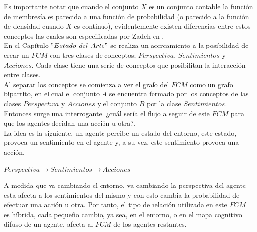 Es importante notar que cuando el conjunto $X$ es un conjunto contable la función de membresía es parecida a una 
función de probabilidad (o parecido a la función de densidad cuando $X$ es continuo), evidentemente existen
diferencias entre estos conceptos las cuales son especificadas por Zadeh en \autocite{Zadeh1965}.\\


En el Capítulo $"Estado$ $del$ $Arte"$ se realiza un acercamiento a la posibilidad de crear un $FCM$ con tres clases de 
conceptos; $Perspectiva$, $Sentimientos$ y $Acciones$. Cada clase tiene una serie de conceptos que posibilitan la 
interacción entre clases.\\
Al separar los conceptos se comienza a ver el grafo del $FCM$ como un grafo bipartito, en el cual el conjunto $A$
se encuentra formado por los conceptos de las clases $Perspectiva$ y $Acciones$ y el conjunto $B$ por la clase
$Sentimientos$. Entonces surge una interrogante, ¿cuál sería el flujo a seguir de este $FCM$ para que los agentes
decidan una acción u otra?.\\
La idea es la siguiente, un agente percibe un estado del entorno, este estado, provoca un sentimiento en el agente
y, a su vez, este sentimiento provoca una acción.
\begin{center}
    $Perspectiva \rightarrow Sentimientos \rightarrow Acciones$\\
\end{center}

A medida que va cambiando el entorno, va cambiando la perspectiva del agente esta afecta a los sentimientos del mismo 
y con esto cambia la probabilidad de efectuar una acción u otra. Por tanto, el tipo de relación utilizada en este $FCM$
es híbrida, cada pequeño cambio, ya sea, en el entorno, o en el mapa cognitivo difuso de un agente, afecta al $FCM$ de los
agentes restantes.\\


